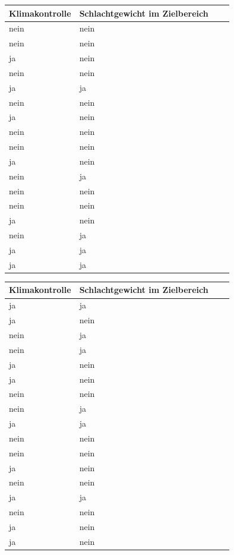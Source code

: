 \documentclass[a4paper, 9pt]{scrartcl}\usepackage[]{graphicx}\usepackage[]{xcolor}
\begin{document}
\begin{center}
\begin{minipage}[t]{0.45\textwidth}
\small
\begin{center}

\begin{tabular}{p{2.5cm}p{2.5cm}p{2.5cm}p{2.5cm}}
\toprule
Klimakontrolle & Schlachtgewicht im Zielbereich\\
\midrule
nein & nein\\
nein & nein\\
ja & nein\\
nein & nein\\
ja & ja\\
\addlinespace
nein & nein\\
ja & nein\\
nein & nein\\
nein & nein\\
ja & nein\\
\addlinespace
nein & ja\\
nein & nein\\
nein & nein\\
ja & nein\\
nein & ja\\
\addlinespace
ja & ja\\
ja & ja\\
\bottomrule
\end{tabular}


\end{center}
\end{minipage}
\begin{minipage}[t]{0.45\textwidth}
\small
\begin{center}

\begin{tabular}{p{2.5cm}p{2.5cm}p{2.5cm}p{2.5cm}}
\toprule
Klimakontrolle & Schlachtgewicht im Zielbereich\\
\midrule
ja & ja\\
ja & nein\\
nein & ja\\
nein & ja\\
ja & nein\\
\addlinespace
ja & nein\\
nein & nein\\
nein & ja\\
ja & ja\\
nein & nein\\
\addlinespace
nein & nein\\
ja & nein\\
nein & nein\\
ja & ja\\
nein & nein\\
\addlinespace
ja & nein\\
ja & nein\\
\bottomrule
\end{tabular}


\end{center}
\end{minipage}
\end{center}
\end{document}
